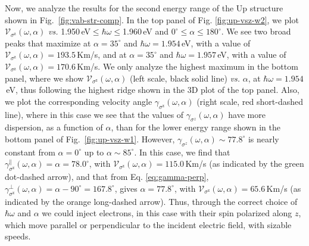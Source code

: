 \documentclass[floatfix,prb,aps,superscriptaddress,showpacs,11pt,preprint,letterpaper]{revtex4}
\begin{document}
Now, we analyze the results for the second energy range of the Up structure
shown in Fig.~\ref{fig:vab-str-comp}. In the top panel
of Fig. \ref{fig:up-vsz-w2}, we plot $\mathcal{V}_{\sigma^{\mathrm{z}}}
(\omega,\alpha)$ {\it vs.} 1.950\,eV$\leq\hbar\omega\leq$1.960\,eV and
$0^\circ\leq\alpha\leq 180^\circ$. We see two broad peaks that maximize at
$\alpha=35^{\circ}$ and $\hbar\omega= 1.954$\,eV, with a value of
$\mathcal{V}_{\sigma^{\mathrm{z}}}(\omega,\alpha) = 193.5$\,Km/s, and at
$\alpha=35^{\circ}$ and $\hbar\omega= 1.957$\,eV, with a value of
$\mathcal{V}_{\sigma^{\mathrm{z}}}(\omega,\alpha) = 170.6$\,Km/s. We only
analyze the highest  maximum in the bottom panel, where we  show
$\mathcal{V}_{\sigma^{\mathrm{z}}} (\omega,\alpha)$ (left scale,
black solid line) {\it vs.} $\alpha$, at $\hbar\omega= 1.954$\,eV, thus following the highest ridge
shown in the 3D plot of the top panel. Also, we plot the corresponding velocity
angle $\gamma_{\sigma^\mathrm{z}}(\omega,\alpha)$ (right scale, red short-dashed  line),
where in this case we see that the values of $\gamma_{\sigma^z}(\omega,\alpha)$
have more dispersion, as a function of $\alpha$, than for the lower energy
range shown in the bottom panel of Fig.~\ref{fig:up-vsz-w1}. However,
$\gamma_{\sigma^z}(\omega,\alpha)\sim 77.8^\circ$ is nearly constant from
$\alpha=0^\circ$ up to $\alpha\sim 85^\circ$. In this case, we find that
$\gamma^\parallel_{\sigma^\mathrm{z}}(\omega,\alpha)=\alpha=78.0^\circ$, with
$\mathcal{V}_{\sigma^{\mathrm{z}}}(\omega,\alpha) = 115.0$\,Km/s 
(as indicated by the green dot-dashed arrow), and that from Eq. \eqref{eq:gamma-perp},
$\gamma^\perp_{\sigma^\mathrm{z}}(\omega,\alpha)=\alpha-90^\circ=167.8^\circ$,
gives $\alpha=77.8^\circ$, with
$\mathcal{V}_{\sigma^{\mathrm{z}}}(\omega,\alpha) = 65.6$\,Km/s 
(as indicated by the orange long-dashed  arrow). 
Thus, through the correct choice of $\hbar\omega$ and $\alpha$ we could
inject electrons, in this case with their spin polarized along $z$, which move
parallel or perpendicular to the incident electric field, with sizable speeds.
\end{document}
